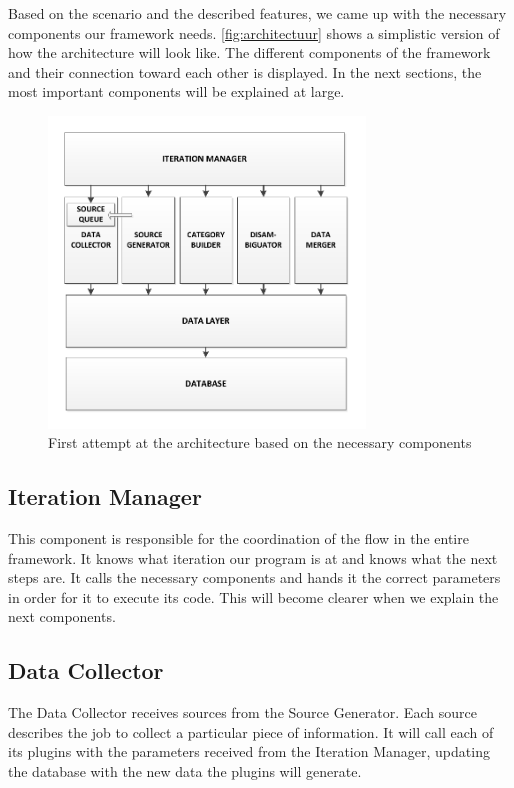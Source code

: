 Based on the scenario and the described features, we came up with the necessary components our framework needs. \autoref{fig:architectuur} shows a simplistic version of how the architecture will look like. The different components of the framework and their connection toward each other is displayed. In the next sections, the most important components will be explained at large.

\begin{figure}[htb]
	\centering
		\includegraphics[width=0.75\textwidth]{fig/architectuur}
	\caption{First attempt at the architecture based on the necessary components}
	\label{fig:architectuur}
\end{figure}

\subsection{Iteration Manager}

This component is responsible for the coordination of the flow in the entire framework. It knows what iteration our program is at and knows what the next steps are. It calls the necessary components and hands it the correct parameters in order for it to execute its code. This will become clearer when we explain the next components.

\subsection{Data Collector}

The Data Collector receives sources from the Source Generator. Each source describes the job to collect a particular piece of information. It will call each of its plugins with the parameters received from the Iteration Manager, updating the database with the new data the plugins will generate.


